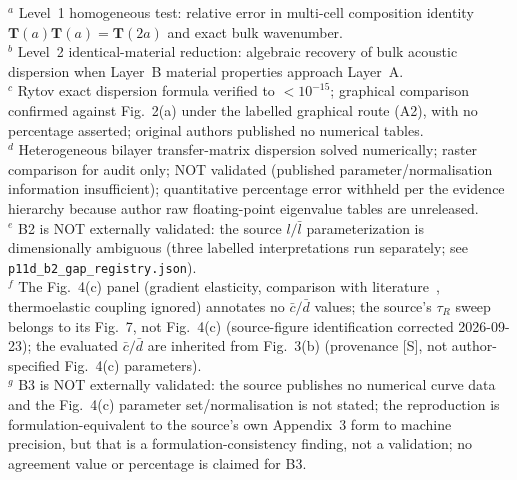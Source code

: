 \begin{table}[t]
\begin{tabularx}{\textwidth}{@{}l >{\raggedright\arraybackslash}X >{\raggedright\arraybackslash}X ccc >{\raggedright\arraybackslash}p{2.0cm} >{\raggedright\arraybackslash}p{2.4cm}@{}}
\hline\hline
\end{tabularx}
\begin{flushleft}
\scriptsize
$^a$ Level~1 homogeneous test: relative error in multi-cell composition identity $\mathbf{T}(a)\mathbf{T}(a) = \mathbf{T}(2a)$ and exact bulk wavenumber.\\
$^b$ Level~2 identical-material reduction: algebraic recovery of bulk acoustic dispersion when Layer~B material properties approach Layer~A.\\
$^c$ Rytov exact dispersion formula verified to $< 10^{-15}$; graphical comparison confirmed against Fig.~2(a) under the labelled graphical route (A2), with no percentage asserted; original authors published no numerical tables.\\
$^d$ Heterogeneous bilayer transfer-matrix dispersion solved numerically; raster comparison for audit only; NOT validated (published parameter/normalisation information insufficient); quantitative percentage error withheld per the evidence hierarchy because author raw floating-point eigenvalue tables are unreleased.\\
$^e$ B2 is NOT externally validated: the source $l/\bar{l}$ parameterization is dimensionally ambiguous (three labelled interpretations run separately; see \texttt{p11d\_b2\_gap\_registry.json}).\\
$^f$ The Fig.~4(c) panel (gradient elasticity, comparison with literature~\cite{liweizhou2016}, thermoelastic coupling ignored) annotates no $\bar{c}/\bar{d}$ values; the source's $\tau_R$ sweep belongs to its Fig.~7, not Fig.~4(c) (source-figure identification corrected 2026-09-23); the evaluated $\bar{c}/\bar{d}$ are inherited from Fig.~3(b) (provenance [S], not author-specified Fig.~4(c) parameters).\\
$^g$ B3 is NOT externally validated: the source publishes no numerical curve data and the Fig.~4(c) parameter set/normalisation is not stated; the reproduction is formulation-equivalent to the source's own Appendix~3 form to machine precision, but that is a formulation-consistency finding, not a validation; no agreement value or percentage is claimed for B3.\\
\end{flushleft}
\end{table}
